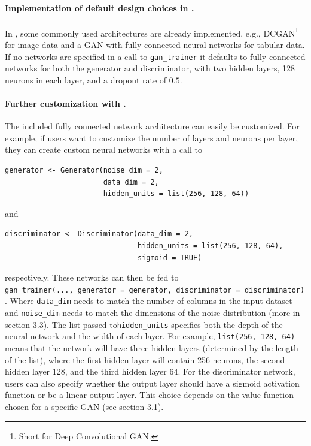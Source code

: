 \paragraph{\texorpdfstring{Implementation of default design choices in .}{Implementation of default design choices in .}}\label{implementation-of-default-design-choices-in-.-1}

In , some commonly used architectures are already implemented, e.g.,
DCGAN\footnote{Short for Deep Convolutional GAN.} \citep{radford2016} for image data and a GAN with fully connected
neural networks for tabular data. If no networks are specified in a call
to \texttt{gan\_trainer} it defaults to fully connected networks for both the generator and
discriminator, with two hidden layers, 128 neurons in each layer, and a dropout rate of \(0.5\).

\paragraph{\texorpdfstring{Further customization with .}{Further customization with .}}\label{further-customization-with-.-1}

The included fully connected network architecture can easily be customized. For example, if users want to customize the number of layers and neurons per layer, they can create custom neural networks with a call to

\begin{verbatim}
generator <- Generator(noise_dim = 2, 
                       data_dim = 2, 
                       hidden_units = list(256, 128, 64))
\end{verbatim}

and

\begin{verbatim}
discriminator <- Discriminator(data_dim = 2, 
                               hidden_units = list(256, 128, 64), 
                               sigmoid = TRUE)
\end{verbatim}

respectively. These networks can then be fed to \texttt{gan\_trainer(...,\ generator\ =\ generator,\ discriminator\ =\ discriminator)}. Where \texttt{data\_dim} needs to match the number of columns in the input dataset and \texttt{noise\_dim} needs to match the dimensions of the noise distribution (more in section \hyperref[sec:noise]{3.3}). The list passed to\texttt{hidden\_units} specifies both the depth of the neural network and the width of each layer. For example, \texttt{list(256,\ 128,\ 64)} means that the network will have three hidden layers (determined by the length of the list), where the first hidden layer will contain 256 neurons, the second hidden layer 128, and the third hidden layer 64. For the discriminator network, users can also specify whether the output layer should have a sigmoid activation function or be a linear output layer. This choice depends on the value function chosen for a specific GAN (see section \hyperref[sec:value]{3.1}).

